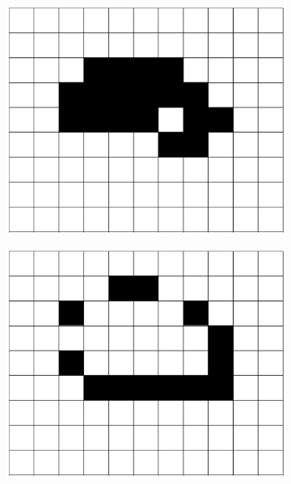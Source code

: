 \documentclass[12pt]{article}
\numberwithin{figure}{section} %
\begin{document}
\begin{figure}[H]
\begin{subfigure}{0.18\textwidth}
   \end{subfigure}
     \begin{subfigure}{0.18\textwidth}
     \centering
     \includegraphics[width=\linewidth]{Section1/7.1}
     \subcaption{}
   \end{subfigure}
     \begin{subfigure}{0.18\textwidth}
     \centering
     \includegraphics[width=\linewidth]{Section1/7.2}
     \subcaption{}
   \end{subfigure}
     \begin{subfigure}{0.18\textwidth}

\end{subfigure}
\end{figure}
\end{document}
